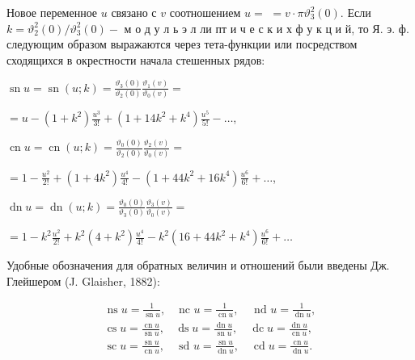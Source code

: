 \documentclass[10pt]{article}
\begin{document}
Новое переменное $u$ связано с $v$ соотношением $u=$ $=v \cdot \pi \vartheta_{3}^{2}(0)$. Если $k=\vartheta_{2}^{2}(0) / \vartheta_{3}^{2}(0)-$ м о д у л ь э л ли пт и ч е с к и х ф у к ц и й, то Я. э. ф. следующим образом выражаются через тета-функции или посредством сходящихся в окрестности начала стешенных рядов:



$\operatorname{sn} u=\operatorname{sn}(u ; k)=\frac{\vartheta_{3}(0)}{\vartheta_{2}(0)} \frac{\vartheta_{1}(v)}{\vartheta_{0}(v)}=$



$=u-\left(1+k^{2}\right) \frac{u^{3}}{3 !}+\left(1+14 k^{2}+k^{4}\right) \frac{u^{5}}{5 !}-\ldots$,



$\operatorname{cn} u=\operatorname{cn}(u ; k)=\frac{\vartheta_{0}(0)}{\vartheta_{2}(0)} \frac{\vartheta_{2}(v)}{\vartheta_{0}(v)}=$



$=1-\frac{u^{2}}{2 !}+\left(1+4 k^{2}\right) \frac{u^{4}}{4 !}-\left(1+44 k^{2}+16 k^{4}\right) \frac{u^{6}}{6 !}+\ldots$,



$\operatorname{dn} u=\operatorname{dn}(u ; k)=\frac{\vartheta_{0}(0)}{\vartheta_{3}(0)} \frac{\vartheta_{3}(v)}{\vartheta_{0}(v)}=$



$=1-k^{2} \frac{u^{2}}{2 !}+k^{2}\left(4+k^{2}\right) \frac{u^{4}}{4 !}-k^{2}\left(16+44 k^{2}+k^{4}\right) \frac{u^{6}}{6 !}+\ldots$



Удобные обозначения для обратных величин и отношений были введены Дж. Глейшером (J. Glaisher, 1882):



\[

\begin{aligned}

\operatorname{ns} u=\frac{1}{\operatorname{sn} u}, & \text { nc } u=\frac{1}{\operatorname{cn} u}, \quad \text { nd } u=\frac{1}{\operatorname{dn} u}, \\

\operatorname{cs} u=\frac{\operatorname{cn} u}{\operatorname{sn} u}, & \operatorname{ds} u=\frac{\operatorname{dn} u}{\operatorname{sn} u}, \quad \operatorname{dc} u=\frac{\operatorname{dn} u}{\operatorname{cn} u}, \\

\operatorname{sc} u=\frac{\operatorname{sn} u}{\operatorname{cn} u}, & \text { sd } u=\frac{\operatorname{sn} u}{\operatorname{dn} u}, \quad \operatorname{cd} u=\frac{\operatorname{cn} u}{\operatorname{dn} u} .

\end{aligned}

\]
\end{document}

